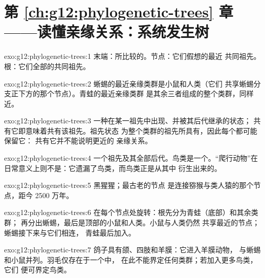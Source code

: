 \section*{第 \ref{ch:g12:phylogenetic-trees} 章——读懂亲缘关系：系统发生树}

\begin{solution}{exo:g12:phylogenetic-trees:1}
末端：所比较的。节点：它们假想的最近
共同祖先。根：它们全部的共同祖先。
\end{solution}

\begin{solution}{exo:g12:phylogenetic-trees:2}
蜥蜴的最近亲缘类群是小鼠和人类（它们
共享蜥蜴分支正下方的那个节点）。青蛙的最近亲缘类群
是其余三者组成的整个类群，同样近。
\end{solution}

\begin{solution}{exo:g12:phylogenetic-trees:3}
一种在某一祖先中出现、并被其后代继承的状态；
共有它即意味着共有该祖先。祖先状态
为整个类群的祖先所具有，因此每个都可能保留它：
共有它并不能说明更近的
亲缘关系。
\end{solution}

\begin{solution}{exo:g12:phylogenetic-trees:4}
一个祖先及其全部后代。鸟类是一个。“爬行动物”在
日常意义上则不是：它遗漏了鸟类，而鸟类正是从其中
衍生出来的。
\end{solution}

\begin{solution}{exo:g12:phylogenetic-trees:5}
黑猩猩；最古老的节点
是连接猕猴与类人猿的那个节点，距今 2500 万年。
\end{solution}

\begin{solution}{exo:g12:phylogenetic-trees:6}
在每个节点处旋转：根先分为青蛙（底部）和其余类群；
再分出蜥蜴，最后是顶部的小鼠和人类。小鼠与人类仍然
共享最近的节点；蜥蜴接下来与它们相连，
青蛙最后加入。
\end{solution}

\begin{solution}{exo:g12:phylogenetic-trees:7}
鸽子具有颌、四肢和羊膜：它进入羊膜动物，
与蜥蜴和小鼠并列。羽毛仅存在于一个中，
在此不能界定任何类群；若加入更多鸟类，它们
便可界定鸟类。
\end{solution}

